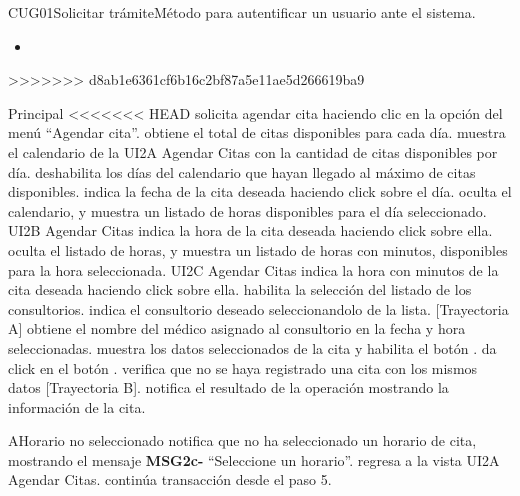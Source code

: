 \begin{UseCase}{CUG01}{Solicitar trámite}{Método para autentificar un usuario ante el sistema.}
{\begin{itemize}
			\begin{itemize}
				\item 
			\end{itemize}
		\end{itemize}
>>>>>>> d8ab1e6361cf6b16c2bf87a5e11ae5d266619ba9
  }
\end{UseCase}

\begin{UCtrayectoria}{Principal}
<<<<<<< HEAD
  \UCpaso[\UCactor] solicita agendar cita haciendo clic en la opción del menú “Agendar cita”.
  \UCpaso obtiene el total de citas disponibles para cada día.
  \UCpaso muestra el calendario de la UI2A Agendar Citas con la cantidad de citas disponibles por día.
  \UCpaso deshabilita los días del calendario que hayan llegado al máximo de citas disponibles.
  \UCpaso[\UCactor] indica la fecha de la cita deseada haciendo click sobre el día.
  \UCpaso oculta el calendario, y muestra un listado de horas disponibles para el día seleccionado. UI2B Agendar Citas
  \UCpaso[\UCactor] indica la hora de la cita deseada haciendo click sobre ella.
   \UCpaso oculta el listado de horas, y muestra un listado de horas con minutos, disponibles para la hora seleccionada. UI2C Agendar Citas
   \UCpaso[\UCactor] indica la hora con minutos de la cita deseada haciendo click sobre ella.
  \UCpaso habilita la selección del listado de los consultorios.
  \UCpaso[\UCactor] indica el consultorio deseado seleccionandolo de la lista. [Trayectoria A]
  \UCpaso obtiene el nombre del médico asignado al consultorio en la fecha y hora seleccionadas. 
  \UCpaso muestra los datos seleccionados de la cita y habilita el botón .
  \UCpaso[\UCactor] da click en el botón .
  \UCpaso verifica que no se haya registrado una cita con los mismos datos [Trayectoria B].
  \UCpaso notifica el resultado de la operación mostrando la información de la cita.
\end{UCtrayectoria}

\begin{UCtrayectoriaA}{A}{Horario no seleccionado}
  \UCpaso notifica que no ha seleccionado un horario de cita, mostrando el mensaje {\bf MSG2c-} “Seleccione un horario”.
  \UCpaso regresa a la vista UI2A Agendar Citas.
  \UCpaso continúa transacción desde el paso 5.
\end{UCtrayectoriaA}


